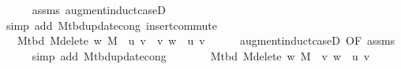 \begin{isabellebody}
\ \ \ \ \isamarkupfalse%
\ assms\ augment{\isacharunderscore}{\kern0pt}induct{\isacharunderscore}{\kern0pt}case{\isacharunderscore}{\kern0pt}{}D{\isacharparenleft}{\kern0pt}{}{}{\isacharcomma}{\kern0pt}\ {}{}{\isacharcomma}{\kern0pt}\ {}{}{\isacharparenright}{\kern0pt}\isanewline
\ \ \ \ \isamarkupfalse%
\ {\isacharparenleft}{\kern0pt}simp\ add{\isacharcolon}{\kern0pt}\ M{\isacharunderscore}{\kern0pt}tbd{\isacharunderscore}{\kern0pt}update{\isacharunderscore}{\kern0pt}cong\ insert{\isacharunderscore}{\kern0pt}commute{\isacharparenright}{\kern0pt}\isanewline
\ \ \isamarkupfalse%
\ \isamarkupfalse%
\ {\isachardoublequoteopen}{\isachardot}{\kern0pt}{\isachardot}{\kern0pt}{\isachardot}{\kern0pt}\ {\isacharequal}{\kern0pt}\ M{\isacharunderscore}{\kern0pt}tbd\ {\isacharparenleft}{\kern0pt}M{\isacharunderscore}{\kern0pt}delete\ w\ M{\isacharparenright}{\kern0pt}\ {\isasymunion}\ {\isacharbraceleft}{\kern0pt}{\isacharbraceleft}{\kern0pt}u{\isacharcomma}{\kern0pt}\ v{\isacharbraceright}{\kern0pt}{\isacharbraceright}{\kern0pt}\ {\isacharminus}{\kern0pt}\ {\isacharbraceleft}{\kern0pt}{\isacharbraceleft}{\kern0pt}v{\isacharcomma}{\kern0pt}\ w{\isacharbraceright}{\kern0pt}{\isacharbraceright}{\kern0pt}\ {\isasymunion}\ {\isacharbraceleft}{\kern0pt}{\isacharbraceleft}{\kern0pt}u{\isacharcomma}{\kern0pt}\ v{\isacharbraceright}{\kern0pt}{\isacharbraceright}{\kern0pt}{\isachardoublequoteclose}\isanewline
\ \ \ \ \isamarkupfalse%
\ augment{\isacharunderscore}{\kern0pt}induct{\isacharunderscore}{\kern0pt}case{\isacharunderscore}{\kern0pt}{}D{\isacharparenleft}{\kern0pt}{}{\isacharcomma}{\kern0pt}\ {}{}{\isacharparenright}{\kern0pt}{\isacharbrackleft}{\kern0pt}OF\ assms{\isacharbrackright}{\kern0pt}\isanewline
\ \ \ \ \isamarkupfalse%
\ {\isacharparenleft}{\kern0pt}simp\ add{\isacharcolon}{\kern0pt}\ M{\isacharunderscore}{\kern0pt}tbd{\isacharunderscore}{\kern0pt}update{\isacharunderscore}{\kern0pt}cong{\isacharparenright}{\kern0pt}\isanewline
\ \ \isamarkupfalse%
\ \isamarkupfalse%
\ {\isachardoublequoteopen}{\isachardot}{\kern0pt}{\isachardot}{\kern0pt}{\isachardot}{\kern0pt}\ {\isacharequal}{\kern0pt}\ M{\isacharunderscore}{\kern0pt}tbd\ {\isacharparenleft}{\kern0pt}M{\isacharunderscore}{\kern0pt}delete\ w\ M{\isacharparenright}{\kern0pt}\ {\isacharminus}{\kern0pt}\ {\isacharbraceleft}{\kern0pt}{\isacharbraceleft}{\kern0pt}v{\isacharcomma}{\kern0pt}\ w{\isacharbraceright}{\kern0pt}{\isacharbraceright}{\kern0pt}\ {\isasymunion}\ {\isacharbraceleft}{\kern0pt}{\isacharbraceleft}{\kern0pt}u{\isacharcomma}{\kern0pt}\ v{\isacharbraceright}{\kern0pt}{\isacharbraceright}{\kern0pt}{\isachardoublequoteclose}\isanewline

\end{isabellebody}

